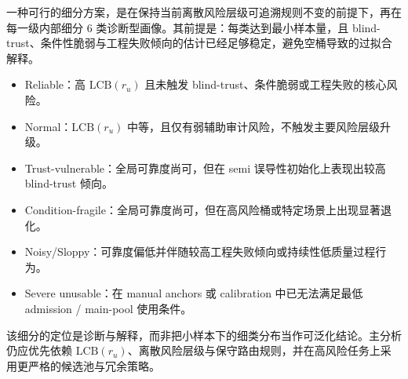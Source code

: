 一种可行的细分方案，是在保持当前离散风险层级可追溯规则不变的前提下，再在每一级内部细分 6 类诊断型画像。其前提是：每类达到最小样本量，且 blind-trust、条件性脆弱与工程失败倾向的估计已经足够稳定，避免空桶导致的过拟合解释。
\begin{itemize}
	\item Reliable：高 $\mathrm{LCB}(r_u)$ 且未触发 blind-trust、条件脆弱或工程失败的核心风险。
	\item Normal：$\mathrm{LCB}(r_u)$ 中等，且仅有弱辅助审计风险，不触发主要风险层级升级。
	\item Trust-vulnerable：全局可靠度尚可，但在 semi 误导性初始化上表现出较高 blind-trust 倾向。
	\item Condition-fragile：全局可靠度尚可，但在高风险桶或特定场景上出现显著退化。
	\item Noisy/Sloppy：可靠度偏低并伴随较高工程失败倾向或持续性低质量过程行为。
	\item Severe unusable：在 manual anchors 或 calibration 中已无法满足最低 admission / main-pool 使用条件。
\end{itemize}
该细分的定位是诊断与解释，而非把小样本下的细类分布当作可泛化结论。主分析仍应优先依赖 $\mathrm{LCB}(r_u)$、离散风险层级与保守路由规则，并在高风险任务上采用更严格的候选池与冗余策略。


